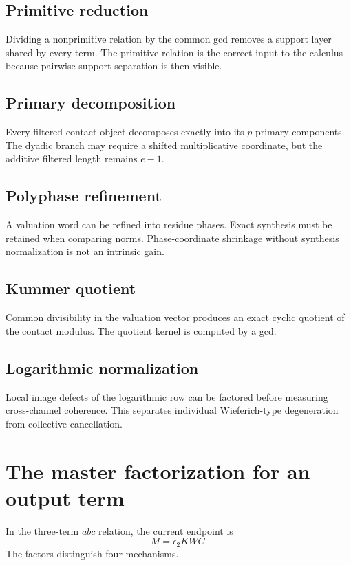\subsection{Primitive reduction}
Dividing a nonprimitive relation by the common gcd removes a support layer shared by every term. The primitive relation is the correct input to the calculus because pairwise support separation is then visible.

\subsection{Primary decomposition}
Every filtered contact object decomposes exactly into its $p$-primary components. The dyadic branch may require a shifted multiplicative coordinate, but the additive filtered length remains $e-1$.

\subsection{Polyphase refinement}
A valuation word can be refined into residue phases. Exact synthesis must be retained when comparing norms. Phase-coordinate shrinkage without synthesis normalization is not an intrinsic gain.

\subsection{Kummer quotient}
Common divisibility in the valuation vector produces an exact cyclic quotient of the contact modulus. The quotient kernel is computed by a gcd.

\subsection{Logarithmic normalization}
Local image defects of the logarithmic row can be factored before measuring cross-channel coherence. This separates individual Wieferich-type degeneration from collective cancellation.

\section{The master factorization for an output term}
In the three-term $abc$ relation, the current endpoint is
\[
\boxed{
M=\epsilon_2KWC.
}
\]
The factors distinguish four mechanisms.

